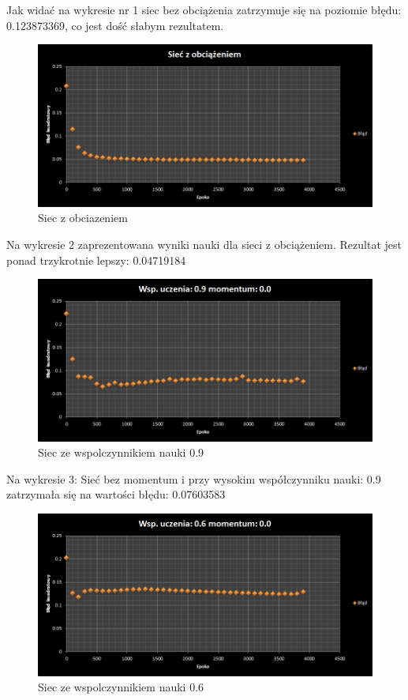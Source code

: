 \documentclass{classrep}
\begin{document}
Jak widać na wykresie nr 1 siec bez obciążenia zatrzymuje się na poziomie błędu: 0.123873369,
co jest dość słabym rezultatem.


\begin{figure}[ht]
\centering
			\includegraphics[scale=0.65]{pictures/test02.png}
	\caption{Siec z obciazeniem}
	\label{fig:Siec z obciazeniem}
\end{figure}

Na wykresie 2 zaprezentowana wyniki nauki dla sieci z obciążeniem. Rezultat jest ponad trzykrotnie lepszy: 0.04719184


\begin{figure}[ht]
\centering
			\includegraphics[scale=0.65]{pictures/test03.png}
	\caption{Siec ze wspolczynnikiem nauki 0.9}
	\label{fig:Siec ze wspolczynnikiem nauki 0.9}
\end{figure}

Na wykresie 3: Sieć bez momentum i przy wysokim współczynniku nauki: 0.9 zatrzymała się na wartości błędu: 0.07603583


\begin{figure}[ht]
\centering
			\includegraphics[scale=0.65]{pictures/test04.png}
	\caption{Siec ze wspolczynnikiem nauki 0.6}
	\label{fig:Siec ze wspolczynnikiem nauki 0.6}
\end{figure}
\end{document}
